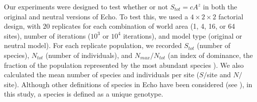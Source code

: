 Our experiments were designed to test whether or not $S_{tot} = cA^z$
in both the original and neutral versions of Echo.  To test this,
we used a $4 \times 2 \times 2$ factorial
design, with $20$ replicates for each combination of world area (1, 4,
16, or 64 sites), number of iterations ($10^3$ or $10^4$ iterations),
and model type (original or neutral model).  For each replicate
population, we recorded $S_{tot}$ (number of species), $N_{tot}$
(number of individuals), and $N_{max}/N_{tot}$ (an index of dominance,
the fraction of the population represented by the most abundant species
\cite{Pielou77}).  We also calculated the mean number of species and
individuals per site ($S/$site and $N/$site).
Although other definitions of species in Echo have been considered
(see \cite{ForrestAndJones94}), in this study, a species is defined as
a unique genotype.  

